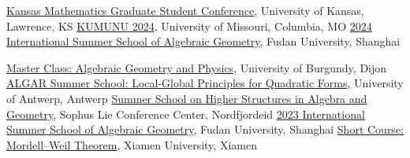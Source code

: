\documentclass[11pt,letterpaper,sans]{moderncv}
\begin{document}
\cvitem{\textcolor{color1}{2024}}{}
  {\href{https://sites.google.com/view/kmgsc/}{Kansas Mathematics Graduate Student Conference}, University of Kansas, Lawrence, KS}
  {\href{https://sites.google.com/view/kumunu-2024/home}{KUMUNU 2024}, University of Missouri, Columbia, MO}
  {\href{https://scms.fudan.edu.cn/info/4588/6631.htm}{2024 International Summer School of Algebraic Geometry}, Fudan University, Shanghai}

\cvitem{\textcolor{color1}{2023}}{}
  {\href{http://ronan.terpereau.perso.math.cnrs.fr/Master_Class_2023_Dijon.html}{Master Class: Algebraic Geometry and Physics}, University of Burgundy, Dijon}
  {\href{https://www.uantwerpen.be/en/summer-winter-schools/algar/programme/previous-editions/2023/}{ALGAR Summer School: Local-Global Principles for Quadratic Forms}, University of Antwerp, Antwerp}
  {\href{https://wiki.math.ntnu.no/nordfjordeid2023/start}{Summer School on Higher Structures in Algebra and Geometry}, Sophus Lie Conference Center, Nordfjordeid}
  {\href{https://scms.fudan.edu.cn/info/4503/5820.htm}{2023 International Summer School of Algebraic Geometry}, Fudan University, Shanghai}
  {\href{https://tianyuan.xmu.edu.cn/cn/MiniCourses/3183.html}{Short Course: Mordell--Weil Theorem}, Xiamen University, Xiamen}
\end{document}
